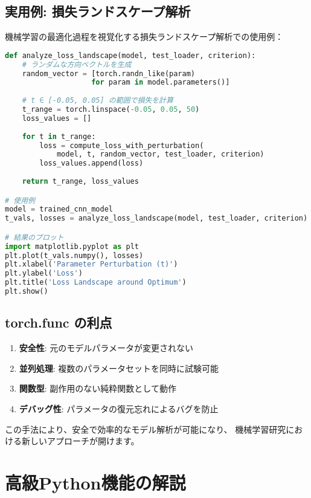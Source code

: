 \documentclass{ltjsarticle}      %
\begin{document}
\subsection{実用例: 損失ランドスケープ解析}
機械学習の最適化過程を視覚化する損失ランドスケープ解析での使用例：

\begin{lstlisting}[language=Python]
def analyze_loss_landscape(model, test_loader, criterion):
    # ランダムな方向ベクトルを生成
    random_vector = [torch.randn_like(param) 
                    for param in model.parameters()]
    
    # t ∈ [-0.05, 0.05] の範囲で損失を計算
    t_range = torch.linspace(-0.05, 0.05, 50)
    loss_values = []
    
    for t in t_range:
        loss = compute_loss_with_perturbation(
            model, t, random_vector, test_loader, criterion)
        loss_values.append(loss)
    
    return t_range, loss_values

# 使用例
model = trained_cnn_model
t_vals, losses = analyze_loss_landscape(model, test_loader, criterion)

# 結果のプロット
import matplotlib.pyplot as plt
plt.plot(t_vals.numpy(), losses)
plt.xlabel('Parameter Perturbation (t)')
plt.ylabel('Loss')
plt.title('Loss Landscape around Optimum')
plt.show()
\end{lstlisting}

\subsection{torch.func の利点}
\begin{enumerate}
    \item \textbf{安全性}: 元のモデルパラメータが変更されない
    \item \textbf{並列処理}: 複数のパラメータセットを同時に試験可能
    \item \textbf{関数型}: 副作用のない純粋関数として動作
    \item \textbf{デバッグ性}: パラメータの復元忘れによるバグを防止
\end{enumerate}

この手法により、安全で効率的なモデル解析が可能になり、
機械学習研究における新しいアプローチが開けます。

\section{高級Python機能の解説}
\end{document}
